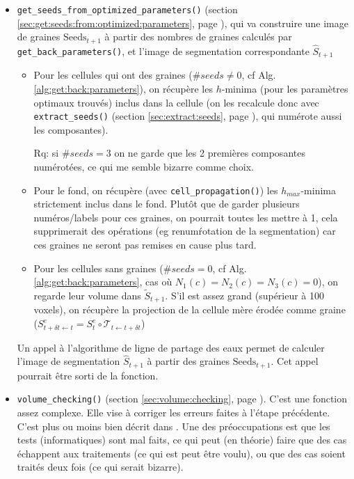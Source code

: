 \documentclass{article}
\begin{document}
\begin{itemize}
\begin{itemize}
%
%
\item \texttt{get\_seeds\_from\_optimized\_parameters()}
(section \ref{sec:get:seeds:from:optimized:parameters}, page \pageref{sec:get:seeds:from:optimized:parameters}), qui va construire une image de graines $\mathrm{Seeds}_{t+1}$  \`a partir des nombres de graines calcul\'es par \texttt{get\_back\_parameters()}, et l'image de segmentation correspondante $\hat{S}_{t+1}$

\begin{itemize}
\item Pour les cellules qui ont des graines ($\# seeds \neq 0$, cf Alg. \ref{alg:get:back:parameters}), on r\'ecup\`ere les $h$-minima (pour les param\`etres optimaux trouv\'es) inclus dans la cellule (on les recalcule donc avec \texttt{extract\_seeds()} (section \ref{sec:extract:seeds}, page \pageref{sec:extract:seeds}), qui num\'erote aussi les composantes).

Rq: si  $\# seeds = 3$ on ne garde que les 2 premi\`eres composantes num\'erot\'ees, ce qui me semble bizarre comme choix.

\item Pour le fond, on r\'ecup\`ere  (avec \texttt{cell\_propagation()}) les $h_{max}$-minima strictement inclus dans le fond. Plut\^ot que de garder plusieurs num\'eros/labels pour ces graines, on pourrait toutes les mettre \`a 1, cela supprimerait des op\'erations (eg renum\'rotation de la segmentation) car ces graines ne seront pas remises en cause plus tard.

\item Pour les cellules sans graines ($\# seeds = 0$, cf Alg. \ref{alg:get:back:parameters}, cas o\`u $N_1(c) = N_2(c) = N_3(c) = 0$), on regarde leur volume dans $\tilde{S}_{t+1}$. S'il est assez grand (sup\'erieur \`a 100 voxels), on r\'ecup\`ere la projection de la cellule m\`ere \'erod\'ee comme graine ($S^e_{t+\delta t \leftarrow t} = S^e_t \circ \mathcal{T}_{t \leftarrow t+\delta t}$)
\end{itemize}

Un appel \`a l'algorithme de ligne de partage des eaux permet de calculer l'image de segmentation $\hat{S}_{t+1}$ \`a partir des graines $\mathrm{Seeds}_{t+1}$. Cet appel pourrait \^etre sorti de la fonction.





%
%

\item \texttt{volume\_checking()}
(section \ref{sec:volume:checking}, page \pageref{sec:volume:checking}). C'est une fonction assez complexe. Elle vise \`a corriger les erreurs faites \`a l'\'etape pr\'ec\'edente. C'est plus ou moins bien d\'ecrit dans \cite[section 2.3.3.6, page 73]{guignard:tel-01278725}. Une des pr\'eoccupations est que les tests (informatiques) sont mal faits, ce qui peut (en th\'eorie) faire que des cas \'echappent aux traitements (ce qui est peut \^etre voulu), ou que des cas soient trait\'es deux fois (ce qui serait bizarre).


\end{itemize}
\end{itemize}
\end{document}
